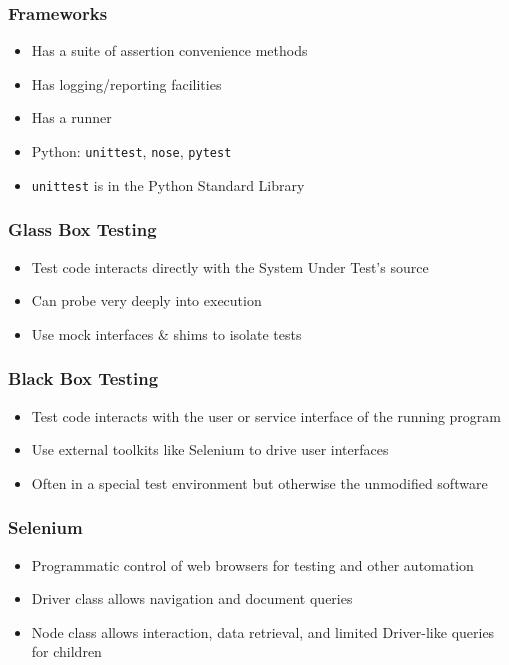 \begin{frame}
  \frametitle{Frameworks}
  \begin{itemize}
    \item Has a suite of assertion convenience methods
    \item Has logging/reporting facilities
    \item Has a runner
    \item Python: \texttt{unittest}, \texttt{nose}, \texttt{pytest}
    \item \texttt{unittest} is in the Python Standard Library
  \end{itemize}
\end{frame}

\begin{frame}
  \frametitle{Glass Box Testing}
  \begin{itemize}
    \item Test code interacts directly with the System Under Test's source
    \item Can probe very deeply into execution
    \item Use mock interfaces \& shims to isolate tests
  \end{itemize}
\end{frame}

\begin{frame}
  \frametitle{Black Box Testing}
  \begin{itemize}
    \item Test code interacts with the user or service interface of the running program
    \item Use external toolkits like Selenium to drive user interfaces
    \item Often in a special test environment but otherwise the unmodified software
  \end{itemize}
\end{frame}

\begin{frame}
  \frametitle{Selenium}
  \begin{itemize}
    \item Programmatic control of web browsers for testing and other automation\citep{holmes2006automating}
    \item Driver class allows navigation and document queries
    \item Node class allows interaction, data retrieval, and limited Driver-like queries for children
  \end{itemize}
\end{frame}

